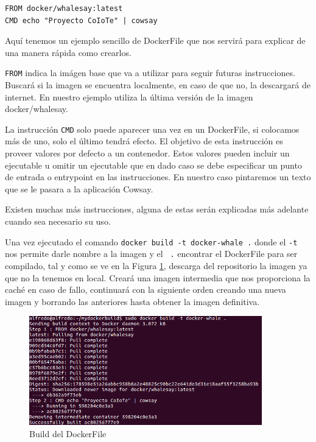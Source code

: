 \begin{verbatim}
FROM docker/whalesay:latest
CMD echo "Proyecto CoIoTe" | cowsay
\end{verbatim}

Aquí tenemos un ejemplo sencillo de DockerFile que nos servirá para explicar de una manera rápida como crearlos. 

\texttt{FROM} indica la imágen base que va a utilizar para seguir futuras instrucciones. Buscará si la imagen se encuentra localmente, en caso de que no, la descargará de internet. En nuestro ejemplo utiliza la última versión de la imagen docker/whalesay.

La instrucción \texttt{CMD} solo puede aparecer una vez en un DockerFile, si colocamos más de uno, solo el último tendrá efecto. El objetivo de esta instrucción es proveer valores por defecto a un contenedor. Estos valores pueden incluir un ejecutable u omitir un ejecutable que en dado caso se debe especificar un punto de entrada o entrypoint en las instrucciones. En nuestro caso pintaremos un texto que se le pasara a la aplicación Cowsay.

Existen muchas más instrucciones, alguna de estas serán explicadas más adelante cuando sea necesario su uso. 

Una vez ejecutado el comando \texttt{docker build -t docker-whale .} donde el \texttt{-t} nos permite darle nombre a la imagen y el \texttt{ .} encontrar el DockerFile para ser compilado, tal y como se ve en la Figura \ref{Build:BuildDockerFile}, descarga del repositorio la imagen ya que no la tenemos en local. Creará una imagen intermedia que nos proporciona la caché en caso de fallo, continuará con la siguiente orden creando una nueva imagen y borrando las anteriores hasta obtener la imagen definitiva. 
 
\begin{figure}[htb]
\begin{center}
\includegraphics[width=0.90\textwidth]{./setup/DockerBuildWale}
\caption{Build del DockerFile}
\label{Build:BuildDockerFile}
\end{center}
\end{figure}
 
